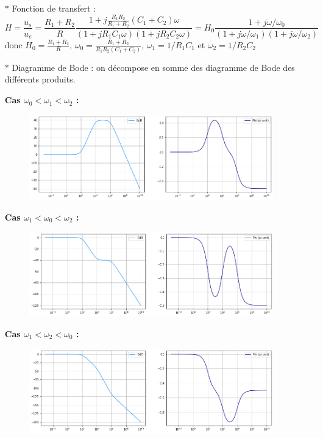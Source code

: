 \documentclass{report}
\begin{document}
\begin{itemize}

	\item[$\ast$] Fonction de transfert :
\begin{equation}
	H=\frac{u_s}{u_e}=\frac{R_1+R_2}{R}\frac{1+j\frac{R_1R_2}{R_1+R_2}(C_1+C_2)\omega}{(1+jR_1C_1\omega)(1+jR_2C_2\omega)}=H_0\frac{1+j\omega/\omega_0}{(1+j\omega/\omega_1)(1+j\omega/\omega_2)}
\end{equation}
donc $H_0=\frac{R_1+R_2}{R}$, $\omega_0=\frac{R_1+R_2}{R_1R_2(C_1+C_2)}$, $\omega_1=1/R_1C_1$ et $\omega_2=1/R_2C_2$

	\item[$\ast$] Diagramme de Bode : on décompose en somme des diagramme de Bode des différents produits.

\textbf{Cas $\omega_0<\omega_1<\omega_2$ :}
\begin{figure}[!h]
	\centering
	\includegraphics[width=0.8\linewidth]{exo2_0.png}
\end{figure}

\textbf{Cas $\omega_1<\omega_0<\omega_2$ :}
\begin{figure}[!h]
	\centering
	\includegraphics[width=0.8\linewidth]{exo2_1.png}
\end{figure}

\textbf{Cas $\omega_1<\omega_2<\omega_0$ :}
\begin{figure}[!h]
	\centering
	\includegraphics[width=0.8\linewidth]{exo2_2.png}
\end{figure}


\end{itemize}
\end{document}
